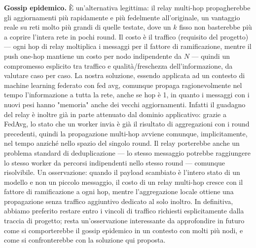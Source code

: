 \textbf{Gossip epidemico.} È un'alternativa legittima: il relay multi-hop propagherebbe gli
aggiornamenti più rapidamente e più fedelmente all'originale, un vantaggio
reale su reti molto più grandi di quelle testate, dove un $k$ fisso non
basterebbe più a coprire l'intera rete in pochi round. Il costo è il
traffico (requisito del progetto)— ogni hop di relay moltiplica i messaggi per il fattore di
ramificazione, mentre il push one-hop mantiene un costo per nodo
indipendente da $N$ — quindi un compromesso esplicito tra traffico e
qualità/freschezza dell'informazione, da valutare caso per caso. La nostra soluzione, essendo applicata ad un contesto
di machine learning federato con fed avg, comunque propaga ragionevolmente nel tempo l'informazione a tutta la rete,
anche se hop è 1, in quanto i messaggi con i nuovi pesi hanno "memoria" anche dei vecchi aggiornamenti.
Infatti il guadagno del relay è inoltre già in parte attenuato dal
dominio applicativo: grazie a FedAvg, lo stato che un worker invia è già il
risultato di aggregazioni con i round precedenti, quindi la propagazione
multi-hop avviene comunque, implicitamente, nel tempo anziché nello spazio
del singolo round. Il relay porterebbe anche un
problema standard di deduplicazione — lo stesso messaggio potrebbe
raggiungere lo stesso worker da percorsi indipendenti nello stesso round —
comunque risolvibile. Un osservazione: quando il payload scambiato è l'intero stato di un modello e non un piccolo
messaggio, il costo di un relay multi-hop cresce con il fattore di
ramificazione a ogni hop, mentre l'aggregazione locale ottiene una
propagazione senza traffico aggiuntivo dedicato al solo inoltro. In definitiva, abbiamo preferito restare entro i
vincoli di traffico richiesti esplicitamente dalla traccia di progetto;
resta un'osservazione interessante da approfondire in futuro come si
comporterebbe il gossip epidemico in un contesto con molti più nodi, e come
si confronterebbe con la soluzione qui proposta.

